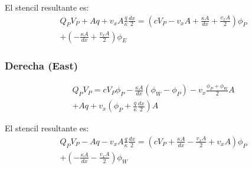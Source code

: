\documentclass{article}
\begin{document}
        El stencil resultante es:
        \begin{multline}
    	    Q_P V_P + A q + v_x A \frac{q}{\kappa} \frac{dx}{2} = (c V_P - v_x A + \frac{\kappa A}{dx} + \frac{v_x A}{2}) \phi_P 
    	    \\ 
    	   + (- \frac{\kappa A}{dx} + \frac{v_x A}{2} )\phi_E
        \end{multline}
        
        \subsubsection{Derecha (East)}
        \begin{multline*}
    	    Q_P V_P = c  V_P \phi_P - \frac{\kappa A}{dx} \left( \phi_W - \phi_P \right) - v_x \frac{\phi_P +  \phi_W}{2} A \\ 
    	        + A q + v_x (\phi_P  +  \frac{q}{\kappa} \frac{dx}{2}) A
    	        \label{eq: celdaPCentrado}
        \end{multline*}
        
        El stencil resultante es:
        \begin{multline}
    	    Q_P V_P - A q - v_x A \frac{q}{\kappa} \frac{dx}{2} = (c V_P + \frac{\kappa A}{dx} - \frac{v_x A}{2} + v_x A) \phi_P 
    	    \\ 
    	   + (- \frac{\kappa A}{dx} - \frac{v_x A}{2} )\phi_W
        \end{multline}
        
\end{document}
